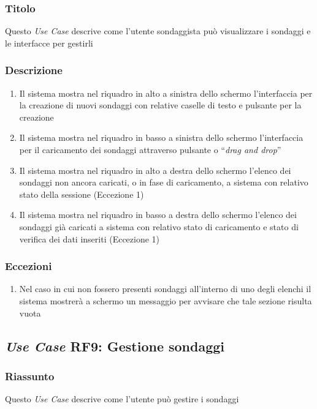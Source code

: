         \subsubsection{Titolo}
            Questo \textit{Use Case} descrive come l'utente sondaggista può visualizzare i sondaggi e le interfacce per gestirli
        \subsubsection{Descrizione}
            \begin{enumerate}
                \item Il sistema mostra nel riquadro in alto a sinistra dello schermo l'interfaccia per la creazione di nuovi sondaggi con relative caselle di testo e pulsante per la creazione
                \item Il sistema mostra nel riquadro in basso a sinistra dello schermo l'interfaccia per il caricamento dei sondaggi attraverso pulsante o ``\textit{drag and drop}''
                \item Il sistema mostra nel riquadro in alto a destra dello schermo l'elenco dei sondaggi non ancora caricati, o in fase di caricamento, a sistema con relativo stato della sessione (Eccezione 1)
                \item Il sistema mostra nel riquadro in basso a destra dello schermo l'elenco dei sondaggi già caricati a sistema con relativo stato di caricamento e stato di verifica dei dati inseriti (Eccezione 1)
            \end{enumerate}
        \subsubsection{Eccezioni}
            \begin{enumerate}
                \item Nel caso in cui non fossero presenti sondaggi all'interno di uno degli elenchi il sistema mostrerà a schermo un messaggio per avvisare che tale sezione risulta vuota
            \end{enumerate}

    \subsection{\textit{Use Case} RF9: Gestione sondaggi}
        \subsubsection{Riassunto}
            Questo \textit{Use Case} descrive come l'utente può gestire i sondaggi

